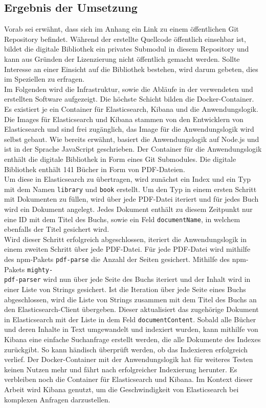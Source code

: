 \documentclass[a4paper]{scrartcl}
\begin{document}
\subsection{Ergebnis der Umsetzung}
Vorab sei erwähnt, dass sich im Anhang ein Link zu einem öffentlichen Git Repository befindet. Während der erstellte Quellcode öffentlich einsehbar ist, bildet die digitale Bibliothek ein privates Submodul in diesem Repository und kann aus Gründen der Lizenzierung nicht öffentlich gemacht werden. Sollte Interesse an einer Einsicht auf die Bibliothek bestehen, wird darum gebeten, dies im Speziellen zu erfragen. \\

Im Folgenden wird die Infrastruktur, sowie die Abläufe in der verwendeten und erstellten Software aufgezeigt. Die höchste Schicht bilden die Docker-Container. Es existiert je ein Container für Elasticsearch, Kibana und die Anwendungslogik. Die Images für Elasticsearch und Kibana stammen von den Entwicklern von Elasticsearch und sind frei zugänglich, das Image für die Anwendungslogik wird selbst gebaut. Wie bereits erwähnt, basiert die Anwendungslogik auf Node.js und ist in der Sprache JavaScript geschrieben. Der Container für die Anwendungslogik enthält die digitale Bibliothek in Form eines Git Submodules. Die digitale Bibliothek enthält 141 Bücher in Form von PDF-Dateien. \\
Um diese in Elasticsearch zu übertragen, wird zunächst ein Index und ein Typ mit dem Namen \texttt{library} und \texttt{book} erstellt. Um den Typ in einem ersten Schritt mit Dokumenten zu füllen, wird über jede PDF-Datei iteriert und für jedes Buch wird ein Dokument angelegt. Jedes Dokument enthält zu diesem Zeitpunkt nur eine ID mit dem Titel des Buchs, sowie ein Feld \texttt{documentName}, in welchem ebenfalls der Titel gesichert wird. \\
Wird dieser Schritt erfolgreich abgeschlossen, iteriert die Anwendungslogik in einem zweiten Schritt über jede PDF-Datei. Für jede PDF-Datei wird mithilfe des npm-Pakets \texttt{pdf-parse} die Anzahl der Seiten gesichert. Mithilfe des npm-Pakets \texttt{mighty- \\ pdf-parser} wird nun über jede Seite des Buchs iteriert und der Inhalt wird in einer Liste von Strings gesichert. Ist die Iteration über jede Seite eines Buchs abgeschlossen, wird die Liste von Strings zusammen mit dem Titel des Buchs an den Elasticsearch-Client übergeben. Dieser aktualisiert das zugehörige Dokument in Elasticsearch mit der Liste in dem Feld \texttt{documentContent}. Sobald alle Bücher und deren Inhalte in Text umgewandelt und indexiert wurden, kann mithilfe von Kibana eine einfache Suchanfrage erstellt werden, die alle Dokumente des Indexes zurückgibt. So kann händisch überprüft werden, ob das Indexieren erfolgreich verlief. Der Docker-Container mit der Anwendungslogik hat für weiteres Testen keinen Nutzen mehr und fährt nach erfolgreicher Indexierung herunter. Es verbleiben noch die Container für Elasticsearch und Kibana. Im Kontext dieser Arbeit wird Kibana genutzt, um die Geschwindigkeit von Elasticsearch bei komplexen Anfragen darzustellen.
\end{document}
